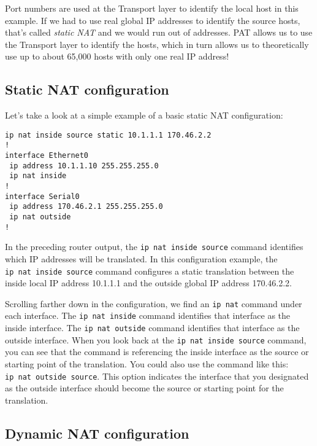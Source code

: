 Port numbers are used at the Transport layer to identify the local host
in this example. If we had to use real global IP addresses to identify
the source hosts, that's called \emph{static NAT}
and we would run out
of addresses. PAT allows us to use the Transport layer to identify the
hosts, which in turn allows us to theoretically use up to about 65,000
hosts with only one real IP address!



\subsection{Static NAT configuration}

Let's take a look at a simple example of a basic static NAT
configuration:

\begin{verbatim}
ip nat inside source static 10.1.1.1 170.46.2.2
!
interface Ethernet0
 ip address 10.1.1.10 255.255.255.0
 ip nat inside
!
interface Serial0
 ip address 170.46.2.1 255.255.255.0
 ip nat outside
!
\end{verbatim}

In the preceding router output, the \texttt{ip\ nat\ inside\ source}
command identifies which IP addresses will be translated. In this
configuration example, the \texttt{ip\ nat\ inside\ source} command
configures a static translation between the inside local IP address
10.1.1.1 and the outside global IP address 170.46.2.2.

Scrolling farther down in the configuration, we find an \texttt{ip\ nat}
command under each interface. The \texttt{ip\ nat\ inside} command
identifies that interface as the inside interface. The
\texttt{ip\ nat\ outside} command identifies that interface as the
outside interface. When you look back at the
\texttt{ip\ nat\ inside\ source} command, you can see that the command
is referencing the inside interface as the source or starting point of
the translation. You could also use the command like this:
\texttt{ip\ nat\ outside\ source}. This option indicates the interface
that you designated as the outside interface should become the source or
starting point for the translation.





\subsection{Dynamic NAT configuration}


